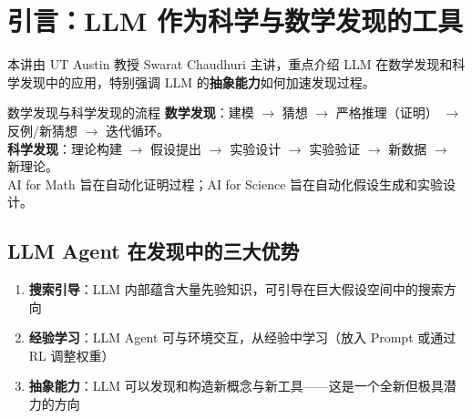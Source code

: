 \section{引言：LLM 作为科学与数学发现的工具}

本讲由 UT Austin 教授 Swarat Chaudhuri 主讲，重点介绍 LLM 在数学发现和科学发现中的应用，特别强调 LLM 的\textbf{抽象能力}如何加速发现过程。

\begin{knowledgebox}{数学发现与科学发现的流程}
\textbf{数学发现}：建模 $\to$ 猜想 $\to$ 严格推理（证明） $\to$ 反例/新猜想 $\to$ 迭代循环。\\
\textbf{科学发现}：理论构建 $\to$ 假设提出 $\to$ 实验设计 $\to$ 实验验证 $\to$ 新数据 $\to$ 新理论。\\
AI for Math 旨在自动化证明过程；AI for Science 旨在自动化假设生成和实验设计。
\end{knowledgebox}

\subsection{LLM Agent 在发现中的三大优势}

\begin{enumerate}
    \item \textbf{搜索引导}：LLM 内部蕴含大量先验知识，可引导在巨大假设空间中的搜索方向
    \item \textbf{经验学习}：LLM Agent 可与环境交互，从经验中学习（放入 Prompt 或通过 RL 调整权重）
    \item \textbf{抽象能力}：LLM 可以发现和构造新概念与新工具——这是一个全新但极具潜力的方向
\end{enumerate}

